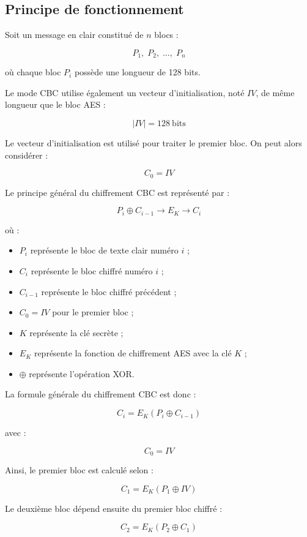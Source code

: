 \documentclass[12pt,a4paper]{article}
\begin{document}
\subsection{Principe de fonctionnement}

Soit un message en clair constitué de $n$ blocs :

\[
P_1,\;P_2,\;\ldots,\;P_n
\]

où chaque bloc $P_i$ possède une longueur de 128 bits.

Le mode CBC utilise également un vecteur d'initialisation,
noté $IV$, de même longueur que le bloc AES :

\[
\boxed{
|IV|=128\ \text{bits}
}
\]

Le vecteur d'initialisation est utilisé pour traiter le premier bloc.
On peut alors considérer :

\[
\boxed{
C_0=IV
}
\]

Le principe général du chiffrement CBC est représenté par :

\[
\boxed{
P_i
\oplus
C_{i-1}
\longrightarrow
E_K
\longrightarrow
C_i
}
\]

où :

\begin{itemize}
    \item $P_i$ représente le bloc de texte clair numéro $i$ ;
    \item $C_i$ représente le bloc chiffré numéro $i$ ;
    \item $C_{i-1}$ représente le bloc chiffré précédent ;
    \item $C_0=IV$ pour le premier bloc ;
    \item $K$ représente la clé secrète ;
    \item $E_K$ représente la fonction de chiffrement AES avec la clé $K$ ;
    \item $\oplus$ représente l'opération XOR.
\end{itemize}

La formule générale du chiffrement CBC est donc :

\[
\boxed{
C_i=E_K(P_i\oplus C_{i-1})
}
\]

avec :

\[
\boxed{
C_0=IV
}
\]

Ainsi, le premier bloc est calculé selon :

\[
\boxed{
C_1=E_K(P_1\oplus IV)
}
\]

Le deuxième bloc dépend ensuite du premier bloc chiffré :

\[
\boxed{
C_2=E_K(P_2\oplus C_1)
}
\]
\end{document}
